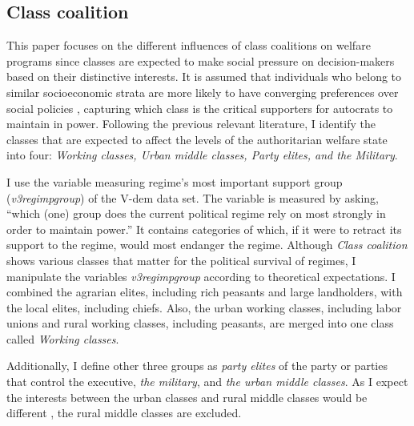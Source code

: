 \documentclass[11pt, notitlepage]{article}
\begin{document}

\subsection{Class coalition}

This paper focuses on the different influences of class coalitions on welfare programs since classes are expected to make social pressure on decision-makers based on their distinctive interests. It is assumed that individuals who belong to similar socioeconomic strata are more likely to have converging preferences over social policies \citet[1495]{Dahlum2019}, capturing which class is the critical supporters for autocrats to maintain in power. Following the previous relevant literature, I identify the classes that are expected to affect the levels of the authoritarian welfare state into four: \textit{Working classes, Urban middle classes, Party elites, and the Military}.

I use the variable measuring regime's most important support group (\textit{v3regimpgroup}) of the V-dem data set. The variable is measured by asking, ``which (one) group does the current political regime rely on most strongly in order to maintain power.'' It contains categories of which, if it were to retract its support to the regime, would most endanger the regime. Although \textit{Class coalition} shows various classes that matter for the political survival of regimes, I manipulate the variables \textit{v3regimpgroup} according to theoretical expectations. I combined the agrarian elites, including rich peasants and large landholders, with the local elites, including chiefs. Also, the urban working classes, including labor unions and rural working classes, including peasants, are merged into one class called \textit{Working classes}.

Additionally, I define other three groups as \textit{party elites} of the party or parties that control the executive, \textit{the military}, and \textit{the urban middle classes}. As I expect the interests between the urban classes and rural middle classes would be different \citep{Dahlum2019}, the rural middle classes are excluded.
\end{document}
